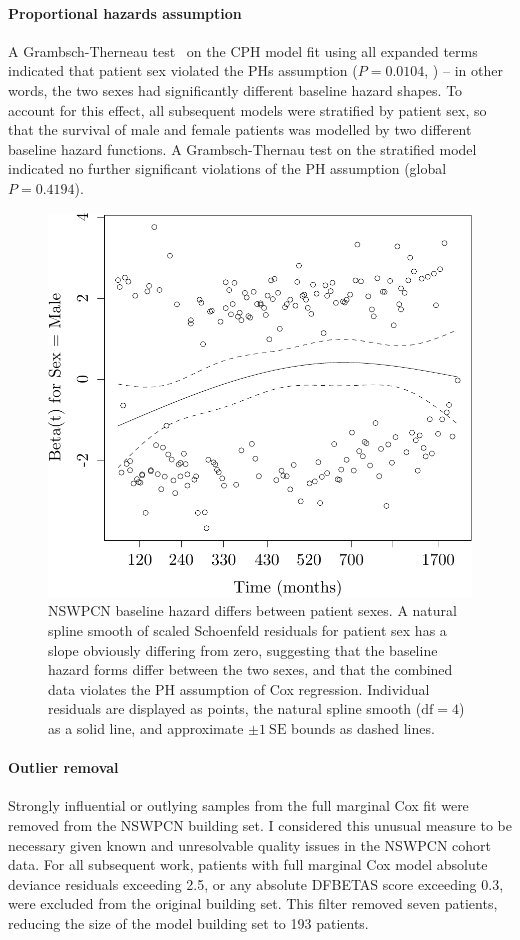 \documentclass[dissertation.tex]{subfiles}
\begin{document}
\paragraph{Proportional hazards assumption}
A Grambsch-Therneau test~\cite{Grambsch1994} on the \gls{CPH} model fit using all expanded terms indicated that patient sex violated the \glspl{PH} assumption ($P = 0.0104$, ) -- in other words, the two sexes had significantly different baseline hazard shapes.  To account for this effect, all subsequent models were stratified by patient sex, so that the survival of male and female patients was modelled by two different baseline hazard functions.  A Grambsch-Thernau test on the stratified model indicated no further significant violations of the \gls{PH} assumption (global $P = 0.4194$).

\begin{figure}
\centering
  \includegraphics[width=.7\linewidth]{analysis/nomogram/figure/05-eda-ph-check-full-1}
  \caption[Baseline hazard forms differ between patient sexes]{NSWPCN baseline hazard differs between patient sexes.  A natural spline smooth of scaled Schoenfeld residuals for patient sex has a slope obviously differing from zero, suggesting that the baseline hazard forms differ between the two sexes, and that the combined data violates the \acrshort{PH} assumption of Cox regression.  Individual residuals are displayed as points, the natural spline smooth ($\mathrm{df}=4$) as a solid line, and approximate $\pm 1\ \mathrm{SE}$ bounds as dashed lines.}
\label{fig:nomo-ph-plot-sex}
\end{figure}

\paragraph{Outlier removal}
Strongly influential or outlying samples from the full marginal Cox fit were removed from the \gls{NSWPCN} building set.  I considered this unusual measure to be necessary given known and unresolvable quality issues in the \gls{NSWPCN} cohort data.  For all subsequent work, patients with full marginal Cox model absolute deviance residuals exceeding 2.5, or any absolute DFBETAS score exceeding 0.3, were excluded from the original building set.  This filter removed seven patients, reducing the size of the model building set to 193 patients.	
\end{document}
